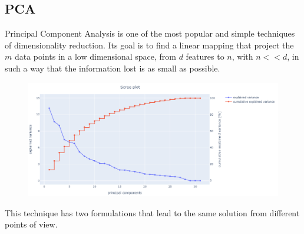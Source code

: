 \documentclass[letterpaper]{article}
\begin{document}
	\subsection{PCA}
	Principal Component Analysis is one of the most popular and simple techniques of dimensionality reduction. Its goal is to find a linear mapping that project the $m$ data points in a low dimensional space, from $d$ features to $n$, with $n << d$, in such a way that the information lost is as small as possible. 
	\begin{figure}[h]
		\centering
		\includegraphics[width=.95\textwidth]{images/scree_plot.png}
		\label{fig:11}
	\end{figure}
	This technique has two formulations that lead to the same solution from different points of view.
\end{document}
